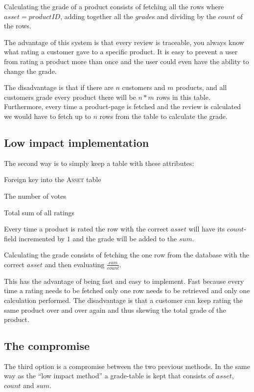 \documentclass[12pt, a4paper,titlepage]{article}
\begin{document}
Calculating the grade of a product consists of fetching all the rows where 
$asset = productID$, adding together all the $grade$s and dividing by the
$count$ of the rows.

The advantage of this system is that every review is traceable, you always
know what rating a customer gave to a specific product. It is easy to prevent
a user from rating a product more than once and the user could even have the
ability to change the grade.

The disadvantage is that if there are $n$ customers and $m$ products, and all
customers grade every product there will be $n*m$ rows in this table.
Furthermore, every time a product-page is fetched and the review is calculated
we would have to fetch up to $n$ rows from the table to calculate the grade.

\subsection{Low impact implementation}
The second way is to simply keep a table with these attributes:
\begin{description}
\setlength\itemsep{-7pt}
\item[asset] Foreign key into the \textsc{Asset} table
\item[count] The number of votes
\item[sum] Total sum of all ratings
\end{description}
Every time a product is rated the row with the correct $asset$ will have its
$count$-field incremented by $1$ and the grade will be added to the $sum$. 

Calculating the grade consists of fetching the one row from the database
with the correct $asset$ and then evaluating $\frac{sum}{count}$.

This has the advantage of being fast and easy to implement. Fast because every
time a rating needs to be fetched only one row needs to be retrieved and only
one calculation performed.
The disadvantage is that a customer can keep rating the same product over and
over again and thus skewing the total grade of the product.

\subsection{The compromise}
The third option is a compromise between the two previous methods.
In the same way as the ``low impact method'' a grade-table is kept that
consists of $asset$, $count$ and $sum$.
\end{document}
